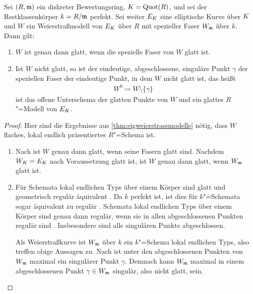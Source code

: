 \begin{Satz}\label{thm:weierstrassglatt}
  Sei $(R,\mathfrak{m})$ ein diskreter Bewertungsring,
  ${K=\operatorname{Quot}(R)}$,
  und sei der Restklassenkörper ${k=R/\mathfrak{m}}$ perfekt.
  Sei weiter $E_{K}$ eine elliptische Kurve über $K$ und
  $W$ ein Weierstraßmodell von $E_{K}$ über $R$
  mit spezieller Faser $W_{\mathfrak{m}}$ über $k$.
  Dann gilt:
  \begin{enumerate}[label=(\alph*)]
  \item $W$ ist genau dann glatt, wenn die spezielle Faser von $W$ glatt
    ist.
  \item Ist $W$ nicht glatt, so ist der eindeutige, abgeschlossene,
    singuläre Punkt $\gamma$ der speziellen Faser der eindeutige
    Punkt, in dem $W$ nicht glatt ist, das heißt
    \begin{gather*}
      W^0\coloneqq W\setminus \{\gamma\}
    \end{gather*}
    ist das offene Unterschema der glatten Punkte von $W$
    und ein glattes $R$"=Modell von $E_{K}$.
  \end{enumerate}
  \begin{proof}
    Hier sind die Ergebnisse aus \ref{thm:eigweierstrassmodelle}
    nötig, dass $W$ flaches, lokal endlich präsentiertes
    $R$"=Schema ist.
    \begin{enumerate}[resume*,start=1]
    \item 
      Nach \cite[Proposition~8.5/17]{bosch} ist $W$ genau dann
      glatt, wenn seine Fasern glatt sind.
      Nachdem $W_{K}=E_{K}$ nach Voraussetzung glatt ist, ist $W$ genau
      dann glatt, wenn $W_{\mathfrak{m}}$ glatt ist.
    \item Für Schemata lokal endlichen Typs über einem Körper sind
      glatt und geometrisch regulär äquivalent
      \cite[Corollary~6.32]{wedhorn}.
      Da $k$ perfekt ist, ist dies für $k$"=Schemata sogar
      äquivalent zu regulär
      \cite[Remark~6.33]{wedhorn}.
      Schemata lokal endlichen Typs über einem Körper sind genau dann
      regulär, wenn sie in allen abgeschlossenen Punkten regulär sind
      \cite[Remark~6.25~(3)]{wedhorn}. Insbesondere sind alle
      singulären Punkte abgeschlossen.

      Als Weierstraßkurve ist $W_{\mathfrak{m}}$ über $k$ ein $k$"=Schema
      lokal endlichen Typs, also treffen obige Aussagen zu.
      Nach \cite[Proposition~III.1.4]{silverman} ist unter den
      abgeschlossenen Punkten von $W_{\mathfrak{m}}$ maximal ein singulärer Punkt
      $\gamma$. Demnach kann $W_{\mathfrak{m}}$ maximal in einem abgeschlossenen
      Punkt $\gamma\in W_{\mathfrak{m}}$ singulär, also nicht glatt, sein.


\end{enumerate}
\end{proof}
\end{Satz}
